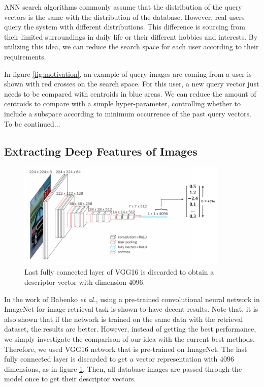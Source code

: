ANN search algorithms commonly assume that the distribution of the query vectors is the same with the distribution of the database. 
However, real users query the system with different distributions.
This difference is sourcing from their limited surroundings in daily life or their different hobbies and interests. 
By utilizing this idea, we can reduce the search space for each user according to their requirements.

In figure \ref{fig:motivation}, an example of query images are coming from a user is shown with red crosses on the search space. 
For this user, a new query vector just needs to be compared with centroids in blue areas. 
We can reduce the amount of centroids to compare with a simple hyper-parameter, controlling whether to include a subspace according to minimum occurrence of the past query vectors. 
To be continued...


\subsection{Extracting Deep Features of Images}

\begin{figure}
    \centering
    \includegraphics[width=0.9\textwidth]{thesis/images/deep_features-fig.png}
    \caption{Last fully connected layer of VGG16\cite{simonyan2014very} is discarded to obtain a descriptor vector with dimension 4096.}
    \label{fig:vec-repr}
\end{figure}

In the work of Babenko \emph{et al.}\cite{babenko2014neural}, using a pre-trained convolutional neural network in ImageNet for image retrieval task is shown to have decent results. 
Note that, it is also shown that if the network is trained on the same data with the retrieval dataset, the results are better.
However, instead of getting the best performance, we simply investigate the comparison of our idea with the current best methods.
Therefore, we used VGG16\cite{simonyan2014very} network that is pre-trained on ImageNet\cite{deng2009imagenet}. 
The last fully connected layer is discarded to get a vector representation with 4096 dimensions, as in figure \ref{fig:vec-repr}.
Then, all database images are passed through the model once to get their descriptor vectors.

